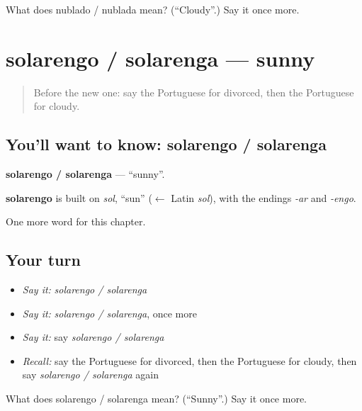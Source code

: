 \begin{tcolorbox}[breakable,colback=teal!4,colframe=teal!35!black,title={Before you move on}]
What does nublado / nublada mean? (\textquotedblleft{}Cloudy\textquotedblright{}.) Say it once more.
\end{tcolorbox}
\section[solarengo / solarenga]{solarengo / solarenga — sunny}

\label{lesson:PT-C217-solarengo-solarenga}



\begin{quote}
Before the new one: say the Portuguese for divorced, then the Portuguese for cloudy.
\end{quote}

\subsection*{You'll want to know: solarengo / solarenga}
\textbf{solarengo / solarenga} — \textquotedblleft{}sunny\textquotedblright{}.

\begin{cousinweb}
\textbf{solarengo} is built on \emph{sol}, \textquotedblleft{}sun\textquotedblright{} ($\leftarrow$ Latin \emph{sol}), with the endings \emph{-ar} and \emph{-engo}.
\end{cousinweb}

\begin{grammarlens}[title={What you've built}]
One more word for this chapter.
\end{grammarlens}

\subsection*{Your turn}
\begin{itemize}
\raggedright
  \item \emph{Say it:} \emph{solarengo / solarenga}
  \item \emph{Say it:} \emph{solarengo / solarenga}, once more
  \item \emph{Say it:} say \emph{solarengo / solarenga}
  \item \emph{Recall:} say the Portuguese for divorced, then the Portuguese for cloudy, then say \emph{solarengo / solarenga} again
\end{itemize}

\begin{tcolorbox}[breakable,colback=teal!4,colframe=teal!35!black,title={Before you move on}]
What does solarengo / solarenga mean? (\textquotedblleft{}Sunny\textquotedblright{}.) Say it once more.
\end{tcolorbox}
